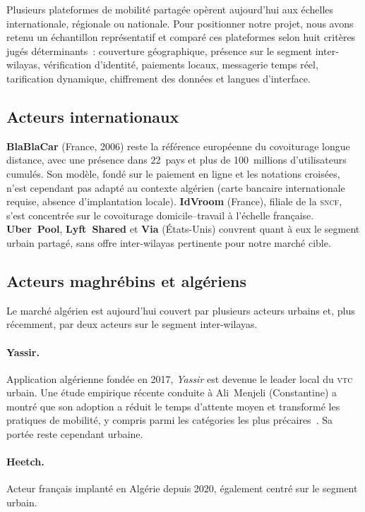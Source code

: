 Plusieurs plateformes de mobilité partagée opèrent aujourd'hui aux échelles internationale, régionale ou nationale. Pour positionner notre projet, nous avons retenu un échantillon représentatif et comparé ces plateformes selon huit critères jugés déterminants~: couverture géographique, présence sur le segment inter-wilayas, vérification d'identité, paiements locaux, messagerie temps réel, tarification dynamique, chiffrement des données et langues d'interface.

\subsection{Acteurs internationaux}

\textbf{BlaBlaCar} (France, 2006) reste la référence européenne du covoiturage longue distance, avec une présence dans 22~pays et plus de 100~millions d'utilisateurs cumulés. Son modèle, fondé sur le paiement en ligne et les notations croisées, n'est cependant pas adapté au contexte algérien (carte bancaire internationale requise, absence d'implantation locale). \textbf{IdVroom} (France), filiale de la \textsc{sncf}, s'est concentrée sur le covoiturage domicile--travail à l'échelle française. \textbf{Uber~Pool}, \textbf{Lyft~Shared} et \textbf{Via} (États-Unis) couvrent quant à eux le segment urbain partagé, sans offre inter-wilayas pertinente pour notre marché cible.

\subsection{Acteurs maghrébins et algériens}

Le marché algérien est aujourd'hui couvert par plusieurs acteurs urbains et, plus récemment, par deux acteurs sur le segment inter-wilayas.

\paragraph{Yassir.} Application algérienne fondée en 2017, \textit{Yassir} est devenue le leader local du \textsc{vtc} urbain. Une étude empirique récente conduite à Ali~Menjeli (Constantine) a montré que son adoption a réduit le temps d'attente moyen et transformé les pratiques de mobilité, y compris parmi les catégories les plus précaires~\cite{naim_yassir_2024}. Sa portée reste cependant urbaine.

\paragraph{Heetch.} Acteur français implanté en Algérie depuis 2020, également centré sur le segment urbain.

